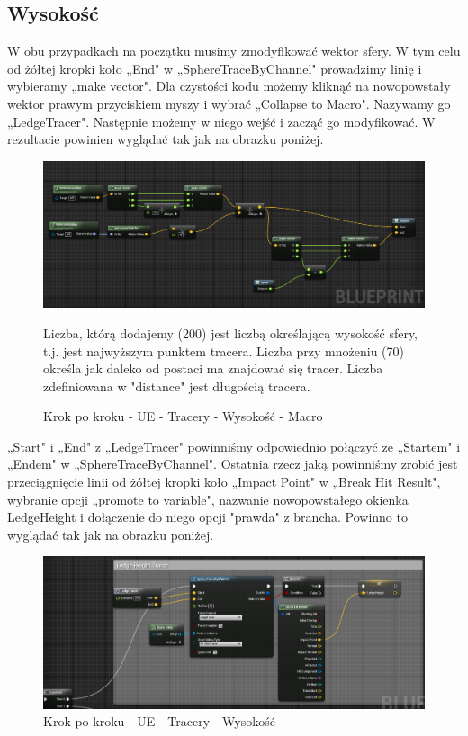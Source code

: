 \documentclass[12pt]{xmgr}
\begin{document}
\subsection{Wysokość}

W obu przypadkach na początku musimy zmodyfikować wektor sfery. W tym celu od żółtej kropki koło „End" w „SphereTraceByChannel" prowadzimy linię i wybieramy „make vector". Dla czystości kodu możemy kliknąć na nowopowstały wektor prawym przyciskiem myszy i wybrać „Collapse to Macro". Nazywamy go „LedgeTracer". Następnie możemy w niego wejść i zacząć go modyfikować. W rezultacie powinien wyglądać tak jak na obrazku poniżej.

\begin{figure}[!htb]
    \begin{center}
    \includegraphics[scale=0.4]{Screeny/UeKrokPoKroku/UE-HeightMacro}
    \end{center}
    \caption{Krok po kroku - UE - Tracery - Wysokość - Macro}
    Liczba, którą dodajemy (200) jest liczbą określającą wysokość sfery, t.j. jest najwyższym punktem tracera. Liczba przy mnożeniu (70) określa jak daleko od postaci ma znajdować się tracer. Liczba zdefiniowana w "distance" jest długością tracera.
\end{figure}
\newpage
„Start" i „End" z „LedgeTracer" powinniśmy odpowiednio połączyć ze „Startem" i „Endem" w „SphereTraceByChannel". Ostatnia rzecz jaką powinniśmy zrobić jest przeciągnięcie linii od żółtej kropki koło „Impact Point" w „Break Hit Result", wybranie opcji „promote to variable", nazwanie nowopowstałego okienka LedgeHeight i dołączenie do niego opcji "prawda" z brancha. Powinno to wyglądać tak jak na obrazku poniżej.

\begin{figure}[!htb]
    \begin{center}
    \includegraphics[scale=0.5]{Screeny/UeKrokPoKroku/UE-Height}
    \end{center}
    \caption{Krok po kroku - UE - Tracery - Wysokość}
\end{figure}
\newpage
\end{document}
